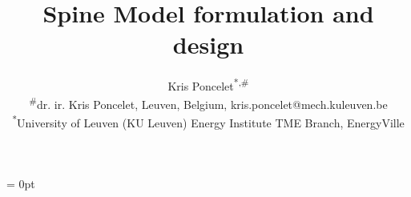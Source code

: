\documentclass[10pt,english]{article}
\title{Spine Model formulation and design}
\date{}
\author{Kris Poncelet\textsuperscript{*,\#}\\ 
{\small \textsuperscript{\#}dr. ir. Kris Poncelet, Leuven, Belgium, kris.poncelet@mech.kuleuven.be} \\
{\small \textsuperscript{*}University of Leuven (KU Leuven) Energy Institute TME Branch, EnergyVille}}
\begin{document}
\voffset = 0pt

\maketitle{}


\tableofcontents


\clearpage




















% 
% 




% 
% 
\end{document}
